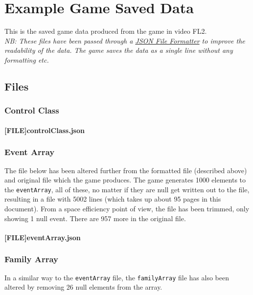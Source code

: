 \chapter{Example Game Saved Data}
\label{chap:exampleSaveD}
This is the saved game data produced from the game in video FL2.\\
\textit{NB: These files have been passed through a \href{https://jsonformatter.curiousconcept.com/}{JSON File Formatter} to improve the readability of the data. The game saves the data as a single line without any formatting etc.}
\section{Files}

\subsection{Control Class}
\subsubsection{[FILE]controlClass.json}


\subsection{Event Array}
The file below has been altered further from the formatted file (described above) and original file which the game produces. The game generates 1000 elements to the \verb|eventArray|, all of these, no matter if they are null get written out to the file, resulting in a file with 5002 lines (which takes up about 95 pages in this document). From a space efficiency point of view, the file has been trimmed, only showing 1 null event. There are 957 more in the original file.
\subsubsection{[FILE]eventArray.json}


\subsection{Family Array}
In a similar way to the \verb|eventArray| file, the \verb|familyArray| file has also been altered by removing 26 null elements from the array.
